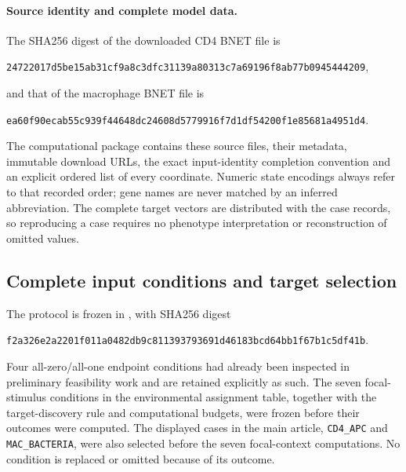 \paragraph{Source identity and complete model data.}
The SHA256 digest of the downloaded CD4 BNET file is
\begin{center}\footnotesize\texttt{24722017d5be15ab31cf9a8c3dfc31139a80313c7a69196f8ab77b0945444209},\end{center}
and that of the macrophage BNET file is
\begin{center}\footnotesize\texttt{ea60f90ecab55c939f44648dc24608d5779916f7d1df54200f1e85681a4951d4}.\end{center}
The computational package contains these source files, their metadata,
immutable download URLs, the exact input-identity completion convention
and an explicit ordered list of every coordinate. Numeric state encodings always refer
to that recorded order; gene names are never matched by an inferred
abbreviation. The complete target vectors are distributed with the
case records, so reproducing a case requires no phenotype interpretation
or reconstruction of omitted values.

\subsection{Complete input conditions and target selection}
The protocol is frozen in ,
with SHA256 digest
\begin{center}\footnotesize\texttt{f2a326e2a2201f011a0482db9c811393793691d46183bcd64bb1f67b1c5df41b}.\end{center}
Four all-zero/all-one endpoint conditions had already been inspected in
preliminary feasibility work and are retained explicitly as such. The
seven focal-stimulus conditions in the environmental assignment table, together
with the target-discovery rule and computational budgets, were frozen
before their outcomes were computed. The displayed cases in the main
article, \texttt{CD4\_APC} and \texttt{MAC\_BACTERIA}, were also selected
before the seven focal-context computations. No condition is replaced or omitted because of its outcome.

